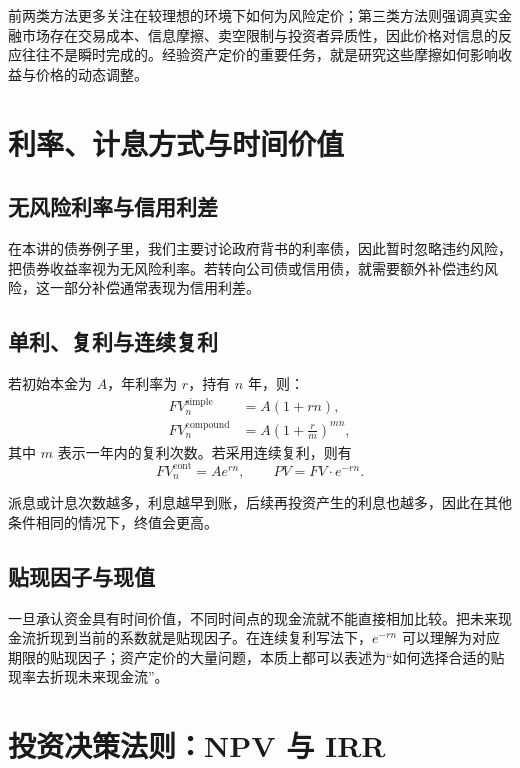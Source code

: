 \documentclass[UTF8,11pt,a4paper]{ctexart}
\begin{document}
前两类方法更多关注在较理想的环境下如何为风险定价；第三类方法则强调真实金融市场存在交易成本、信息摩擦、卖空限制与投资者异质性，因此价格对信息的反应往往不是瞬时完成的。经验资产定价的重要任务，就是研究这些摩擦如何影响收益与价格的动态调整。

\section{利率、计息方式与时间价值}

\subsection{无风险利率与信用利差}

在本讲的债券例子里，我们主要讨论政府背书的利率债，因此暂时忽略违约风险，把债券收益率视为无风险利率。若转向公司债或信用债，就需要额外补偿违约风险，这一部分补偿通常表现为信用利差。

\subsection{单利、复利与连续复利}

若初始本金为 $A$，年利率为 $r$，持有 $n$ 年，则：
\begin{align}
  FV_n^{\text{simple}} &= A(1 + rn), \\
  FV_n^{\text{compound}} &= A\left(1 + \frac{r}{m}\right)^{mn},
\end{align}
其中 $m$ 表示一年内的复利次数。若采用连续复利，则有
\begin{equation}
  FV_n^{\text{cont}} = A e^{rn}, \qquad PV = FV \cdot e^{-rn}.
\end{equation}

派息或计息次数越多，利息越早到账，后续再投资产生的利息也越多，因此在其他条件相同的情况下，终值会更高。

\subsection{贴现因子与现值}

一旦承认资金具有时间价值，不同时间点的现金流就不能直接相加比较。把未来现金流折现到当前的系数就是贴现因子。在连续复利写法下，$e^{-rn}$ 可以理解为对应期限的贴现因子；资产定价的大量问题，本质上都可以表述为“如何选择合适的贴现率去折现未来现金流”。

\section{投资决策法则：NPV 与 IRR}
\end{document}
